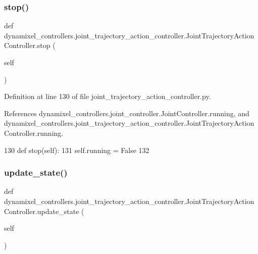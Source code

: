 \subsubsection{\texorpdfstring{stop()}{stop()}}
{\footnotesize\ttfamily def dynamixel\+\_\+controllers.\+joint\+\_\+trajectory\+\_\+action\+\_\+controller.\+Joint\+Trajectory\+Action\+Controller.\+stop (\begin{DoxyParamCaption}\item[{}]{self }\end{DoxyParamCaption})}



Definition at line 130 of file joint\+\_\+trajectory\+\_\+action\+\_\+controller.\+py.



References dynamixel\+\_\+controllers.\+joint\+\_\+controller.\+Joint\+Controller.\+running, and dynamixel\+\_\+controllers.\+joint\+\_\+trajectory\+\_\+action\+\_\+controller.\+Joint\+Trajectory\+Action\+Controller.\+running.


\begin{DoxyCode}
130     \textcolor{keyword}{def }stop(self):
131         self.running = \textcolor{keyword}{False}
132 
\end{DoxyCode}
\mbox{\label{classdynamixel__controllers_1_1joint__trajectory__action__controller_1_1_joint_trajectory_action_controller_af6eaafc747de86e310755b0638c2c9ad}} 
\subsubsection{\texorpdfstring{update\+\_\+state()}{update\_state()}}
{\footnotesize\ttfamily def dynamixel\+\_\+controllers.\+joint\+\_\+trajectory\+\_\+action\+\_\+controller.\+Joint\+Trajectory\+Action\+Controller.\+update\+\_\+state (\begin{DoxyParamCaption}\item[{}]{self }\end{DoxyParamCaption})}



